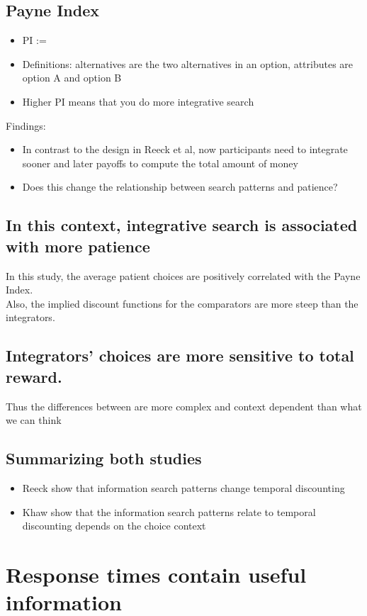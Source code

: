 \subsection{Payne Index}
\begin{itemize}
    \item PI := 
    \item Definitions: alternatives are the two alternatives in an option, attributes are option A and option B
    \item Higher PI means that you do more integrative search
    
\end{itemize}
Findings:
\begin{itemize}
    \item In contrast to the design in Reeck et al, now participants need to integrate sooner and later payoffs to compute the total amount of money
\item Does this change the relationship between search patterns and patience?
\end{itemize}

\subsection{In this context, integrative search is associated with more patience}
In this study, the average patient choices are positively correlated with the Payne Index.
\\Also, the implied discount functions for the comparators are more steep than the integrators.
\subsection{Integrators' choices are more sensitive to total reward.}
Thus the differences between are more complex and context dependent than what we can think
\subsection{Summarizing both studies}
\begin{itemize}
    \item Reeck show that information search patterns change temporal discounting
    \item Khaw show that the information search patterns relate to temporal discounting depends on the choice context
\end{itemize}

\section{Response times contain useful information}
